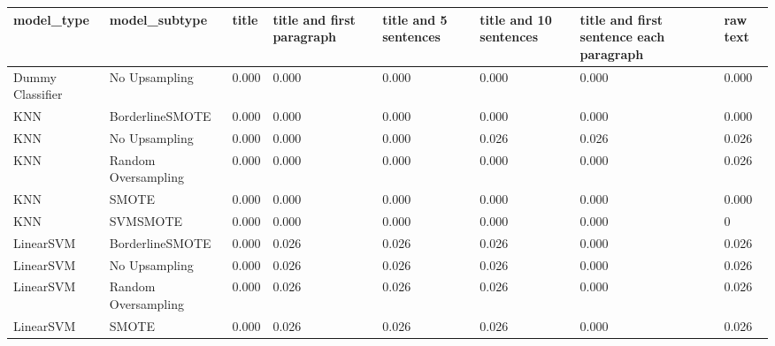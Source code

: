 \begin{tabular}{llllllll}
\toprule
                  model\_type &       model\_subtype & title & title and first paragraph & title and 5 sentences & title and 10 sentences & title and first sentence each paragraph & raw text \\
\midrule
            Dummy Classifier &       No Upsampling & 0.000 &                     0.000 &                 0.000 &                  0.000 &                                   0.000 &    0.000 \\
                         KNN &     BorderlineSMOTE & 0.000 &                     0.000 &                 0.000 &                  0.000 &                                   0.000 &    0.000 \\
                         KNN &       No Upsampling & 0.000 &                     0.000 &                 0.000 &                  0.026 &                                   0.026 &    0.026 \\
                         KNN & Random Oversampling & 0.000 &                     0.000 &                 0.000 &                  0.000 &                                   0.000 &    0.026 \\
                         KNN &               SMOTE & 0.000 &                     0.000 &                 0.000 &                  0.000 &                                   0.000 &    0.000 \\
                         KNN &            SVMSMOTE & 0.000 &                     0.000 &                 0.000 &                  0.000 &                                   0.000 &        0 \\
                   LinearSVM &     BorderlineSMOTE & 0.000 &                     0.026 &                 0.026 &                  0.026 &                                   0.000 &    0.026 \\
                   LinearSVM &       No Upsampling & 0.000 &                     0.026 &                 0.026 &                  0.026 &                                   0.000 &    0.026 \\
                   LinearSVM & Random Oversampling & 0.000 &                     0.026 &                 0.026 &                  0.026 &                                   0.000 &    0.026 \\
                   LinearSVM &               SMOTE & 0.000 &                     0.026 &                 0.026 &                  0.026 &                                   0.000 &    0.026 \\

\end{tabular}

